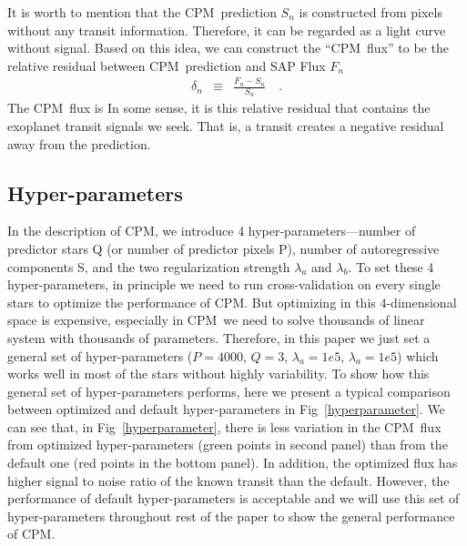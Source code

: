 \documentclass[12pt, preprint]{aastex}
\newcommand{\name}{CPM}
\begin{document}
It is worth to mention that the \name\ prediction $S_{n}$ is constructed from pixels without any transit information. Therefore, it can be regarded as a light curve without
signal. Based on this idea, we can construct the ``\name\ flux'' to be the relative residual
between \name\ prediction and SAP Flux $F_{n}$
\begin{eqnarray}
\delta_{n}&\equiv&\frac{F_{n} - S_{n}}{S_{n}}
\quad .
\end{eqnarray}
The \name\ flux is 
In some sense, it is this relative residual that contains the exoplanet transit signals we 
seek. That is, a transit creates a negative residual away from the prediction. 

\subsection{Hyper-parameters}
In the description of \name, we introduce 4 hyper-parameters---number of predictor 
stars Q (or number of predictor pixels P), number of autoregressive components S, and 
the two regularization strength
$\lambda_{a}$ and $\lambda_{b}$. To set these 4 hyper-parameters, in principle we 
need to run cross-validation on every single stars to optimize the performance of \name.
But optimizing in this 4-dimensional space is expensive, especially in \name\ we need 
to solve thousands of linear system with thousands of parameters. Therefore, in this 
paper we just set a general set of hyper-parameters ($P=4000$, $Q=3$, $
\lambda_a=1e5$, $\lambda_a=1e5$) which works well in most of the stars without
highly variability. To show how this general set of hyper-parameters performs, here we 
present a typical comparison between optimized and default hyper-parameters in 
Fig~\ref{hyperparameter}. We can see that, in Fig~\ref{hyperparameter}, there is less variation in the \name\ flux from optimized hyper-parameters 
(green points in second panel) than from the default one 
(red points in the bottom panel). In addition, the optimized flux has higher signal to 
noise ratio of the known transit than the default. 
However, the performance of default hyper-parameters is acceptable and we will use  
this set of hyper-parameters throughout rest of the paper to show the general 
performance of \name.
\end{document}
